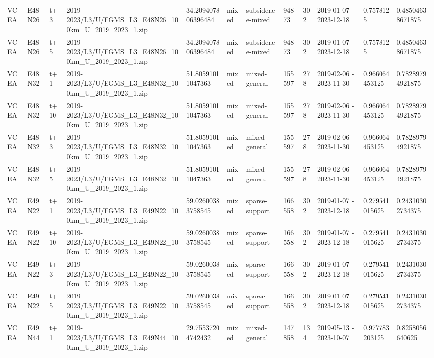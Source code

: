 \begin{landscape}
\begin{longtable}{llllllllllll}
VCEA & E48N26 & t+3 & 2019-2023/L3/U/EGMS\_L3\_E48N26\_100km\_U\_2019\_2023\_1.zip & 34.209407806396484 & mixed & subsidence-mixed & 94873 & 302 & 2019-01-07 - 2023-12-18 & 0.7578125 & 0.48504638671875 \\
VCEA & E48N26 & t+5 & 2019-2023/L3/U/EGMS\_L3\_E48N26\_100km\_U\_2019\_2023\_1.zip & 34.209407806396484 & mixed & subsidence-mixed & 94873 & 302 & 2019-01-07 - 2023-12-18 & 0.7578125 & 0.48504638671875 \\
VCEA & E48N32 & t+1 & 2019-2023/L3/U/EGMS\_L3\_E48N32\_100km\_U\_2019\_2023\_1.zip & 51.80591011047363 & mixed & mixed-general & 155597 & 278 & 2019-02-06 - 2023-11-30 & 0.966064453125 & 0.78289794921875 \\
VCEA & E48N32 & t+10 & 2019-2023/L3/U/EGMS\_L3\_E48N32\_100km\_U\_2019\_2023\_1.zip & 51.80591011047363 & mixed & mixed-general & 155597 & 278 & 2019-02-06 - 2023-11-30 & 0.966064453125 & 0.78289794921875 \\
VCEA & E48N32 & t+3 & 2019-2023/L3/U/EGMS\_L3\_E48N32\_100km\_U\_2019\_2023\_1.zip & 51.80591011047363 & mixed & mixed-general & 155597 & 278 & 2019-02-06 - 2023-11-30 & 0.966064453125 & 0.78289794921875 \\
VCEA & E48N32 & t+5 & 2019-2023/L3/U/EGMS\_L3\_E48N32\_100km\_U\_2019\_2023\_1.zip & 51.80591011047363 & mixed & mixed-general & 155597 & 278 & 2019-02-06 - 2023-11-30 & 0.966064453125 & 0.78289794921875 \\
VCEA & E49N22 & t+1 & 2019-2023/L3/U/EGMS\_L3\_E49N22\_100km\_U\_2019\_2023\_1.zip & 59.02600383758545 & mixed & sparse-support & 166558 & 302 & 2019-01-07 - 2023-12-18 & 0.279541015625 & 0.24310302734375 \\
VCEA & E49N22 & t+10 & 2019-2023/L3/U/EGMS\_L3\_E49N22\_100km\_U\_2019\_2023\_1.zip & 59.02600383758545 & mixed & sparse-support & 166558 & 302 & 2019-01-07 - 2023-12-18 & 0.279541015625 & 0.24310302734375 \\
VCEA & E49N22 & t+3 & 2019-2023/L3/U/EGMS\_L3\_E49N22\_100km\_U\_2019\_2023\_1.zip & 59.02600383758545 & mixed & sparse-support & 166558 & 302 & 2019-01-07 - 2023-12-18 & 0.279541015625 & 0.24310302734375 \\
VCEA & E49N22 & t+5 & 2019-2023/L3/U/EGMS\_L3\_E49N22\_100km\_U\_2019\_2023\_1.zip & 59.02600383758545 & mixed & sparse-support & 166558 & 302 & 2019-01-07 - 2023-12-18 & 0.279541015625 & 0.24310302734375 \\
VCEA & E49N44 & t+1 & 2019-2023/L3/U/EGMS\_L3\_E49N44\_100km\_U\_2019\_2023\_1.zip & 29.75537204742432 & mixed & mixed-general & 147858 & 134 & 2019-05-13 - 2023-10-07 & 0.977783203125 & 0.8258056640625 \\

\end{longtable}
\end{landscape}
